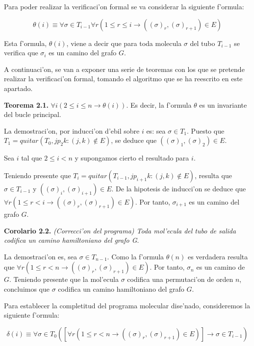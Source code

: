 \documentclass[12pt]{article}
\begin{document}
Para poder realizar la verificaci'on formal se va considerar la siguiente f'ormula:

\begin{equation*}
  \theta(i) \equiv \forall \sigma \in T_{i-1} \forall r (1 \leq r \leq i \longrightarrow ((\sigma)_{r},(\sigma)_{r+1}) \in E)
\end{equation*}

Esta f'ormula, $\theta(i)$, viene a decir que para toda molecula $\sigma$ del tubo $T_{i-1}$ se verifica que
$\sigma_{i}$ es un camino del grafo $G$.

A continuaci'on, se van a exponer una serie de teoremas con los que se pretende realizar la verificaci'on formal,
tomando el algoritmo que se ha reescrito en este apartado.

\textbf{Teorema 2.1.} $\forall i (2 \leq i \leq n \longrightarrow \theta(i))$. Es decir, la f'ormula $\theta$ es un invariante del
bucle principal.

La demostraci'on, por inducci'on d'ebil sobre $i$ es: sea $\sigma \in T_{1}$. Puesto que
$T_{1} = quitar(T_{0}, {jp_{2}k : (j,k) \notin E})$, se deduce que $((\sigma)_{1},(\sigma)_{2}) \in E$.

Sea $i$ tal que $2 \leq i < n$ y supongamos cierto el resultado para $i$.

Teniendo presente que $T_{i} = quitar(T_{i-1}, {jp_{i+1}k : (j,k) \notin E})$, resulta que
$\sigma \in T_{i-1}$ y $((\sigma)_{i},(\sigma)_{i+1}) \in E$. De la hipotesis de inducci'on se deduce que
$\forall r (1 \leq r < i \longrightarrow ((\sigma)_{r},(\sigma)_{r+1}) \in E)$. Por tanto, $\sigma_{i+1}$ es un camino del grafo $G$.

\textbf{Corolario 2.2.} \textit{(Correcci'on del programa) Toda mol'ecula del tubo de salida codifica un camino hamiltoniano
del grafo G}.

La demostraci'on es, sea $\sigma \in T_{n-1}$. Como la f'ormula $\theta(n)$ es verdadera resulta que
$\forall r (1 \leq r < n \longrightarrow ((\sigma)_{r},(\sigma)_{r+1}) \in E)$. Por tanto, $\sigma_{n}$ es un camino de $G$.
Teniendo presente que la mol'ecula $\sigma$ codifica una permutaci'on de orden $n$, concluimos que $\sigma$ codifica
un camino hamiltoniano del grafo $G$.

Para establecer la completitud del programa molecular dise'nado, consideremos la siguiente f'ormula:

\begin{equation*}
  \delta(i) \equiv \forall \sigma \in T_{0} ([\forall r (1 \leq r < n \longrightarrow ((\sigma)_{r},(\sigma)_{r+1})
   \in E)] \longrightarrow \sigma \in T_{i-1})
\end{equation*}
\end{document}
